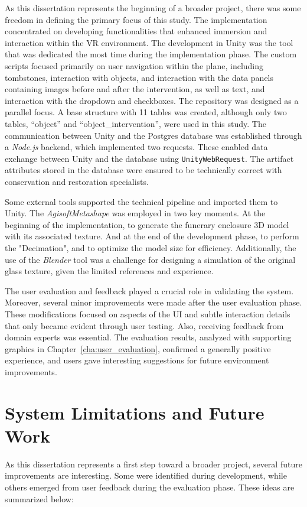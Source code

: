 As this dissertation represents the beginning of a broader project, there was some freedom in defining the primary focus of this study. The implementation concentrated on developing functionalities that enhanced immersion and interaction within the \gls{VR} environment. The development in Unity was the tool that was dedicated the most time during the implementation phase. The custom scripts focused primarily on user navigation within the plane, including tombstones, interaction with objects, and interaction with the data panels containing images before and after the intervention, as well as text, and interaction with the dropdown and checkboxes. The repository was designed as a parallel focus. A base structure with 11 tables was created, although only two tables, “object” and “object\_intervention”, were used in this study. The communication between Unity and the Postgres database was established through a \emph{Node.js} backend, which implemented two requests. These enabled data exchange between Unity and the database using \texttt{UnityWebRequest}. The artifact attributes stored in the database were ensured to be technically correct with conservation and restoration specialists.

Some external tools supported the technical pipeline and imported them to Unity. The \emph{AgisoftMetashape} was employed in two key moments. 
At the beginning of the implementation, to generate the funerary enclosure \gls{3D} model with its associated texture. And at the end of the development phase, to perform the "Decimation", and to optimize the model size for efficiency.
Additionally, the use of the \emph{Blender} tool was a challenge for designing a simulation of the original glass texture, given the limited references and experience.

The user evaluation and feedback played a crucial role in validating the system. Moreover, several minor improvements were made after the user evaluation phase. These modifications focused on aspects of the \gls{UI} and subtle interaction details that only became evident through user testing. Also, receiving feedback from domain experts was essential. The evaluation results, analyzed with supporting graphics in Chapter~\ref{cha:user_evaluation}, confirmed a generally positive experience, and users gave interesting suggestions for future environment improvements.



\section{System Limitations and Future Work}
\label{sec:future}
As this dissertation represents a first step toward a broader project, several future improvements are interesting. 
Some were identified during development, while others emerged from user feedback during the evaluation phase. 
These ideas are summarized below:


